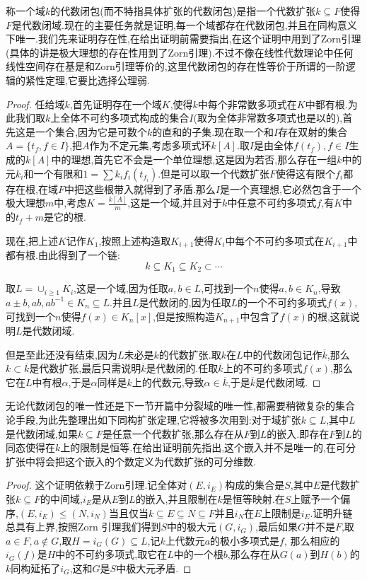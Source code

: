 称一个域$k$的代数闭包(而不特指具体扩张的代数闭包)是指一个代数扩张$k\subseteq F$使得$F$是代数闭域.现在的主要任务就是证明,每一个域都存在代数闭包,并且在同构意义下唯一.我们先来证明存在性,在给出证明前需要指出,在这个证明中用到了Zorn引理(具体的讲是极大理想的存在性用到了Zorn引理).不过不像在线性代数理论中任何线性空间存在基是和Zorn引理等价的,这里代数闭包的存在性等价于所谓的一阶逻辑的紧性定理,它要比选择公理弱.
\begin{proof}

任给域$k$,首先证明存在一个域$K$,使得$k$中每个非常数多项式在$K$中都有根.为此我们取$k$上全体不可约多项式构成的集合$I$(取为全体非常数多项式也是以的),首先这是一个集合,因为它是可数个$k$的直和的子集.现在取一个和$I$存在双射的集合$A=\{t_f,f\in I\}$,把$A$作为不定元集,考虑多项式环$k[A]$.取$I$是由全体$f(t_f),f\in I$生成的$k[A]$中的理想,首先它不会是一个单位理想,这是因为若否,那么存在一组$k$中的元$k_i$和一个有限和$1=\sum k_i f_i(t_{f_i})$.但是可以取一个代数扩张$F$使得这有限个$f_i$都存在根,在域$F$中把这些根带入就得到了矛盾.那么$I$是一个真理想,它必然包含于一个极大理想$m$中,考虑$K=\frac{k[A]}{m}$,这是一个域,并且对于$k$中任意不可约多项式$f$,有$K$中的$t_f+m$是它的根.

现在,把上述$K$记作$K_1$,按照上述构造取$K_{i+1}$使得$K_i$中每个不可约多项式在$K_{i+1}$中都有根.由此得到了一个链:
$$k\subseteq K_1\subseteq K_2\subset\cdots$$

取$L=\cup_{i\ge1} K_i$,这是一个域,因为任取$a,b\in L$,可找到一个$n$使得$a,b\in K_n$,导致$a\pm b,ab,ab^{-1}\in K_n\subseteq L$.并且$L$是代数闭的,因为任取$L$的一个不可约多项式$f(x)$,可找到一个$n$使得$f(x)\in K_n[x]$,但是按照构造$K_{n+1}$中包含了$f(x)$的根,这就说明$L$是代数闭域.

但是至此还没有结束,因为$L$未必是$k$的代数扩张.取$k$在$L$中的代数闭包记作$\overline{k}$,那么$k\subset\overline{k}$是代数扩张,最后只需说明$\overline{k}$是代数闭的.任取$\overline{k}$上的不可约多项式$f(x)$,那么它在$L$中有根$\alpha$,于是$\alpha$同样是$k$上的代数元,导致$\alpha\in\overline{k}$,于是$\overline{k}$是代数闭域.
\end{proof}

无论代数闭包的唯一性还是下一节开篇中分裂域的唯一性,都需要稍微复杂的集合论手段,为此先整理出如下同构扩张定理,它将被多次用到:对于域扩张$k\subseteq L$,其中$L$是代数闭域,如果$k\subseteq F$是任意一个代数扩张,那么存在从$F$到$L$的嵌入.即存在$F$到$L$的同态使得在$k$上的限制是恒等.在给出证明前先指出,这个嵌入并不是唯一的,在可分扩张中将会把这个嵌入的个数定义为代数扩张的可分维数.
\begin{proof}
	
这个证明依赖于Zorn引理.记全体对$(E,i_E)$构成的集合是$S$,其中$E$是代数扩张$k\subseteq F$的中间域,$i_E$是从$E$到$L$的嵌入,并且限制在$k$是恒等映射.在$S$上赋予一个偏序,$(E,i_E)\le (N,i_N)$当且仅当$k\subseteq E\subseteq N\subseteq F$并且$i_N$在$E$上限制是$i_E$.证明升链总具有上界,按照Zorn 引理我们得到$S$中的极大元$(G,i_G)$,最后如果$G$并不是$F$,取$a\in F,a\not\in G$,取$H=i_G(G)\subseteq L$,记$k$上代数元$a$的极小多项式是$f$, 那么相应的$i_G(f)$是$H$中的不可约多项式,取它在$L$中的一个根$b$,那么存在从$G(a)$到$H(b)$的$k$同构延拓了$i_G$,这和$G$是$S$中极大元矛盾.
\end{proof}

